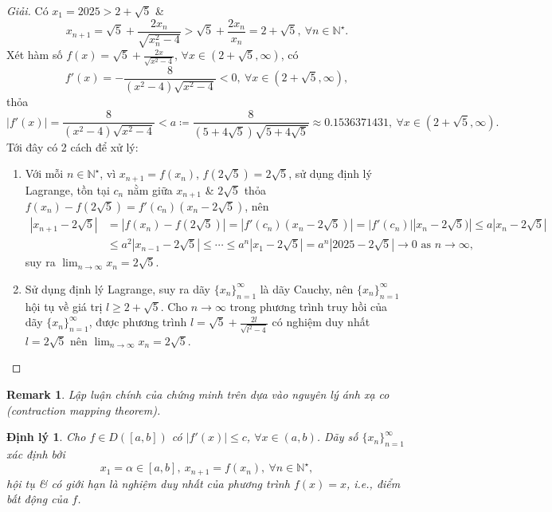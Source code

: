 \documentclass{article}
\newtheorem{dinhly}{Định lý}
\newtheorem{remark}{Remark}
\begin{document}
\begin{proof}[Giải]
	Có $x_1 = 2025 > 2 + \sqrt{5}$ \&
	\begin{equation*}
		x_{n+1} = \sqrt{5} + \frac{2x_n}{\sqrt{x_n^2 - 4}} > \sqrt{5} + \frac{2x_n}{x_n} = 2 + \sqrt{5},\ \forall n\in\mathbb{N}^\star.
	\end{equation*}
	Xét hàm số $f(x) = \sqrt{5} + \frac{2x}{\sqrt{x^2 - 4}}$, $\forall x\in(2 + \sqrt{5},\infty)$, có
	\begin{equation*}
		f'(x) = -\frac{8}{(x^2 - 4)\sqrt{x^2 - 4}} < 0,\ \forall x\in(2 + \sqrt{5},\infty),
	\end{equation*}
	thỏa
	\begin{equation*}
		|f'(x)| = \frac{8}{(x^2 - 4)\sqrt{x^2 - 4}} < a\coloneqq\frac{8}{(5 + 4\sqrt{5})\sqrt{5 + 4\sqrt{5}}}\approx0.1536371431,\ \forall x\in(2 + \sqrt{5},\infty).
	\end{equation*}
	Tới đây có 2 cách để xử lý:
	\begin{enumerate}
		\item Với mỗi $n\in\mathbb{N}^\star$, vì $x_{n+1} = f(x_n)$, $f(2\sqrt{5}) = 2\sqrt{5}$, sử dụng định lý Lagrange, tồn tại $c_n$ nằm giữa $x_{n+1}$ \& $2\sqrt{5}$ thỏa $f(x_n) - f(2\sqrt{5}) = f'(c_n)(x_n - 2\sqrt{5})$, nên
		\begin{align*}
			|x_{n+1} - 2\sqrt{5}| &= |f(x_n) - f(2\sqrt{5})| = |f'(c_n)(x_n - 2\sqrt{5})| = |f'(c_n)||x_n - 2\sqrt{5})|\le a|x_n - 2\sqrt{5}|\\
			&\le a^2|x_{n-1} - 2\sqrt{5}|\le\cdots\le a^n|x_1 - 2\sqrt{5}| = a^n|2025 - 2\sqrt{5}|\to0\mbox{ as } n\to\infty,
		\end{align*}
		suy ra $\lim_{n\to\infty} x_n = 2\sqrt{5}$.
		\item Sử dụng định lý Lagrange, suy ra dãy $\{x_n\}_{n=1}^\infty$ là dãy Cauchy, nên $\{x_n\}_{n=1}^\infty$ hội tụ về giá trị $l\ge2 + \sqrt{5}$. Cho $n\to\infty$ trong phương trình truy hồi của dãy $\{x_n\}_{n=1}^\infty$, được phương trình $l = \sqrt{5} + \frac{2l}{\sqrt{l^2 - 4}}$ có nghiệm duy nhất $l = 2\sqrt{5}$ nên $\lim_{n\to\infty} x_n = 2\sqrt{5}$.
	\end{enumerate}
\end{proof}

\begin{remark}
	Lập luận chính của chứng minh trên dựa vào nguyên lý ánh xạ co (contraction mapping theorem).
\end{remark}

\begin{dinhly}
	Cho $f\in D([a,b])$ có $|f'(x)|\le c$, $\forall x\in(a,b)$. Dãy số $\{x_n\}_{n=1}^\infty$ xác định bởi
	\begin{equation*}
		x_1 = \alpha\in[a,b],\ x_{n+1} = f(x_n),\ \forall n\in\mathbb{N}^\star,
	\end{equation*}
	hội tụ \& có giới hạn là nghiệm duy nhất của phương trình $f(x) = x$, i.e., điểm bất động của $f$.
\end{dinhly}
\end{document}
